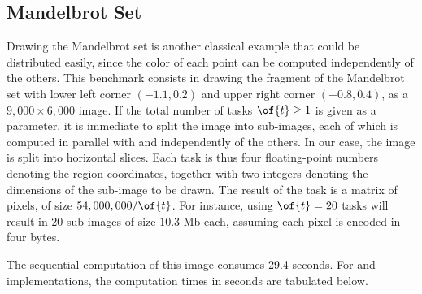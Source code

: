 \documentclass{llncs}
\newcommand{\Ocaml}{OCaml}
\begin{document}
\begin{comment}
  When master and worker programs are compiled with different versions
  of the \Ocaml\ compiler, our library still provides a monomorphic
  API over strings. As a consequence, we need to convert tasks and
  results to and from strings in both master and worker.  The modified
  worker program then looks as follows:
  \begin{ocaml}
    open Mono let worker (ai, bj) = ...  let worker_string s =
    string_of_coeff (worker (task_of_string s)) let () =
    Worker.compute worker_string ()
  \end{ocaml}
  The master program is modified in a similar way.  We simply replace
  \of{Poly} with \of{Mono} and encode/decode coefficients as strings,
  as follows:
  \begin{ocaml}
    let tasks = ... string_of_task ...  let master (_, (i,j)) r =
    c.(i).(j) <- coeff_of_string r; []
  \end{ocaml}
  where \of{string_of_task} and \of{task_of_string} are user-defined
  functions to convert tasks to and from strings.
\end{comment}

\subsection{Mandelbrot Set}

Drawing the Mandelbrot set is another classical example that could be
distributed easily, since the color of each point can be computed
independently of the others. 
This benchmark consists in drawing the fragment of the Mandelbrot set
with lower left corner $(-1.1, 0.2)$ and upper right corner $(-0.8,
0.4)$, as a $9,000\times6,000$ image. 
%
If the total number of tasks $\of{t} \ge 1$ is given as a
parameter,  it is immediate to split the image into  sub-images,
each of which is computed in parallel with and independently of the
others. In our case, the image is split into horizontal slices.
Each task is thus four floating-point numbers denoting the region
coordinates, together with two integers denoting the dimensions of the
sub-image to be drawn. The result of the task is a matrix of pixels,
of size $54,000,000 / \of{t}$. 
For instance, using $\of{t}=20$ tasks will
result in 20 sub-images of size $10.3$ Mb each,
assuming each pixel is encoded in four bytes.

The sequential computation of
this image consumes 29.4 seconds. For  and 
implementations, the computation times in seconds are tabulated below.
\end{document}
